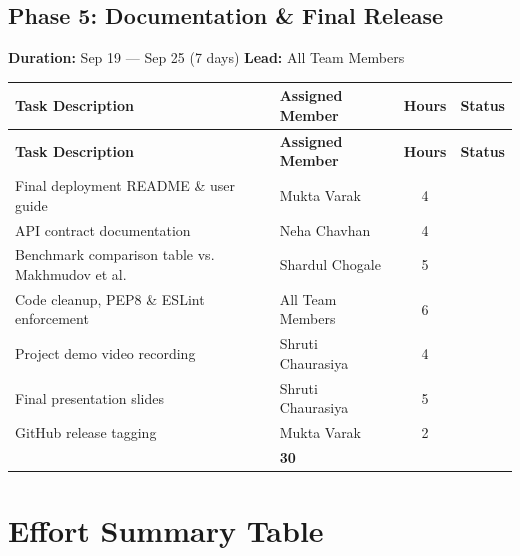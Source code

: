 \documentclass[11pt, a4paper]{article}
\newcommand{\xmark}{\textcolor{danger}{\ding{55}}}
\begin{document}
\subsection{Phase 5: Documentation \& Final Release}
\label{sec:phase5}
\textbf{Duration:} Sep 19 — Sep 25 (7 days) \hfill \textbf{Lead:} All Team Members

\noindent
\small
\begin{longtable}{|p{}|p{}|c|c|}
\hline
\rowcolor{primary!10}
\textbf{Task Description} & \textbf{Assigned Member} & \textbf{Hours} & \textbf{Status} \\
\hline
\endfirsthead
\hline
\rowcolor{primary!10}
\textbf{Task Description} & \textbf{Assigned Member} & \textbf{Hours} & \textbf{Status} \\
\hline
\endhead
Final deployment README \& user guide & Mukta Varak & 4 & \xmark \\
API contract documentation & Neha Chavhan & 4 & \xmark \\
Benchmark comparison table vs. Makhmudov et al. & Shardul Chogale & 5 & \xmark \\
Code cleanup, PEP8 \& ESLint enforcement & All Team Members & 6 & \xmark \\
Project demo video recording & Shruti Chaurasiya & 4 & \xmark \\
Final presentation slides & Shruti Chaurasiya & 5 & \xmark \\
GitHub release tagging & Mukta Varak & 2 & \xmark \\
\hline
\rowcolor{lightgray}
\multicolumn{2}{|r|}{\textbf{Phase 5 Total}} & \textbf{30} & \\
\hline
\end{longtable}
\normalsize

\section{Effort Summary Table}
\label{sec:effort}
\end{document}
